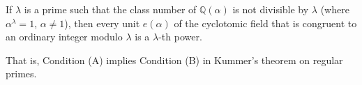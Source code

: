 If $\lambda$ is a prime such that the class number of $\mathbb{Q}(\alpha)$ is not divisible by $\lambda$ (where $\alpha^\lambda = 1$, $\alpha \neq 1$), then every unit $e(\alpha)$ of the cyclotomic field that is congruent to an ordinary integer modulo $\lambda$ is a $\lambda$-th power.

That is, Condition (A) implies Condition (B) in Kummer's theorem on regular primes.
